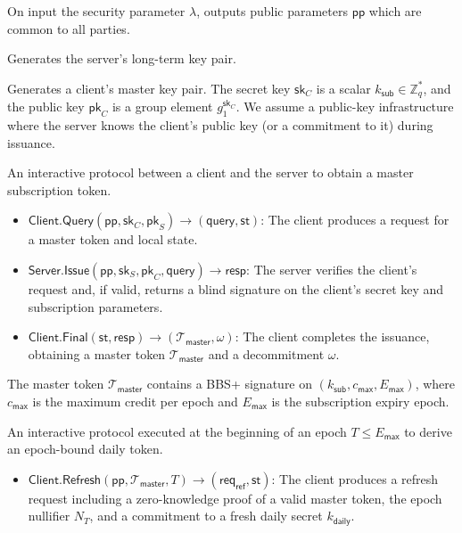 \documentclass[11pt]{article}
\theoremstyle{definitionstyle}
\theoremstyle{plain}
\begin{document}
\begin{description}[leftmargin=*, font=\normalfont]
\item[$\mathsf{Setup}(1^\lambda) \to \mathsf{pp}$:] On input the security parameter $\lambda$, outputs public parameters $\mathsf{pp}$ which are common to all parties.
\item[$\mathsf{Server.KeyGen}(\mathsf{pp}) \to (\mathsf{sk}_S, \mathsf{pk}_S)$:] Generates the server's long-term key pair.
\item[$\mathsf{Client.KeyGen}(\mathsf{pp}) \to (\mathsf{sk}_C, \mathsf{pk}_C)$:] Generates a client's master key pair. The secret key $\mathsf{sk}_C$ is a scalar $k_{\mathsf{sub}} \in \mathbb{Z}_q^*$, and the public key $\mathsf{pk}_C$ is a group element $g_1^{\mathsf{sk}_C}$. We assume a public-key infrastructure where the server knows the client's public key (or a commitment to it) during issuance.
\item[$\mathsf{Issue}$ (interactive):] An interactive protocol between a client and the server to obtain a master subscription token.
  \begin{itemize}
  \item $\mathsf{Client.Query}(\mathsf{pp}, \mathsf{sk}_C, \mathsf{pk}_S) \to (\mathsf{query}, \mathsf{st})$: The client produces a request for a master token and local state.
  \item $\mathsf{Server.Issue}(\mathsf{pp}, \mathsf{sk}_S, \mathsf{pk}_C, \mathsf{query}) \to \mathsf{resp}$: The server verifies the client's request and, if valid, returns a blind signature on the client's secret key and subscription parameters.
  \item $\mathsf{Client.Final}(\mathsf{st}, \mathsf{resp}) \to (\mathcal{T}_{\mathsf{master}}, \omega)$: The client completes the issuance, obtaining a master token $\mathcal{T}_{\mathsf{master}}$ and a decommitment $\omega$.
  \end{itemize}
  The master token $\mathcal{T}_{\mathsf{master}}$ contains a BBS+ signature on $(k_{\mathsf{sub}}, c_{\mathsf{max}}, E_{\mathsf{max}})$, where $c_{\mathsf{max}}$ is the maximum credit per epoch and $E_{\mathsf{max}}$ is the subscription expiry epoch.
\item[$\mathsf{Refresh}$ (interactive):] An interactive protocol executed at the beginning of an epoch $T \le E_{\mathsf{max}}$ to derive an epoch-bound daily token.
  \begin{itemize}
  \item $\mathsf{Client.Refresh}(\mathsf{pp}, \mathcal{T}_{\mathsf{master}}, T) \to (\mathsf{req}_{\mathsf{ref}}, \mathsf{st})$: The client produces a refresh request including a zero-knowledge proof of a valid master token, the epoch nullifier $N_T$, and a commitment to a fresh daily secret $k_{\mathsf{daily}}$.

\end{itemize}
\end{description}
\end{document}
